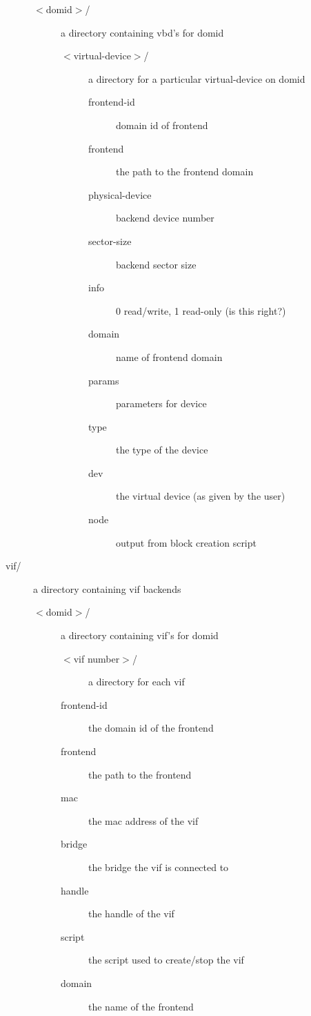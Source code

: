 \documentclass[11pt,twoside,final,openright]{report}
\begin{document}
\begin{description}
\begin{description}
\begin{description}
    \item[$<$domid$>$/] a directory containing vbd's for domid
      \begin{description}
      \item[$<$virtual-device$>$/] a directory for a particular
	virtual-device on domid
	\begin{description}
	\item[frontend-id] domain id of frontend
	\item[frontend] the path to the frontend domain
	\item[physical-device] backend device number
	\item[sector-size] backend sector size
	\item[info] 0 read/write, 1 read-only (is this right?)
	\item[domain] name of frontend domain
	\item[params] parameters for device
	\item[type] the type of the device
	\item[dev] the virtual device (as given by the user)
	\item[node] output from block creation script
	\end{description}
      \end{description}
    \end{description}
  
  \item[vif/] a directory containing vif backends
    \begin{description}
    \item[$<$domid$>$/] a directory containing vif's for domid
      \begin{description}
      \item[$<$vif number$>$/] a directory for each vif
      \item[frontend-id] the domain id of the frontend
      \item[frontend] the path to the frontend
      \item[mac] the mac address of the vif
      \item[bridge] the bridge the vif is connected to
      \item[handle] the handle of the vif
      \item[script] the script used to create/stop the vif
      \item[domain] the name of the frontend
      \end{description}
    \end{description}


\end{description}
\end{description}
\end{document}

